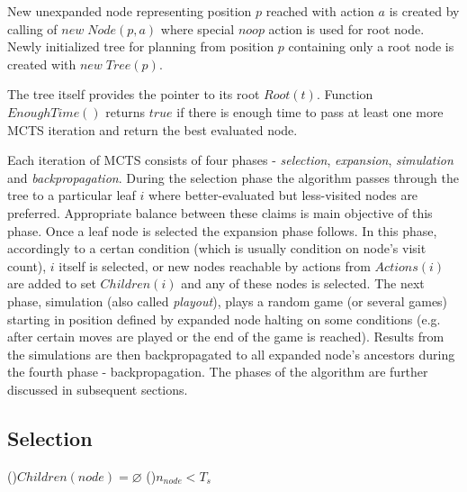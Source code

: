 New unexpanded node representing position $p$ reached with action $a$ is created by calling of
$new\;Node(p,a)$ where special $noop$ action is used for root node. Newly initialized tree for
planning from position $p$
containing only a root node is created with $new\;Tree(p)$.

The
tree itself provides the pointer to its root $Root(t)$. Function $EnoughTime()$ returns $true$ if
there is enough time to pass at least one more MCTS iteration and return the best evaluated node.

Each iteration of MCTS consists of four
phases - \emph{selection}, \emph{expansion}, \emph{simulation} and \emph{backpropagation}. During
the selection phase the 
algorithm passes through the tree to a particular leaf $i$ where better-evaluated but less-visited nodes
are preferred. Appropriate balance between these claims is main objective of this
phase. Once a leaf node is selected the expansion phase follows. In this phase, accordingly to a
certan condition (which is usually condition on node's visit count), $i$ itself is selected, or
new nodes reachable by actions from $Actions(i)$ are added to set $Children(i)$ and any of these
nodes is selected.
The next phase, simulation (also called \emph{playout}), plays a random game (or several games) 
starting
in position defined by expanded node halting on some conditions (e.g. after certain moves are
played or the end of the game is reached). Results from the simulations are then backpropagated to all
expanded node's ancestors during the fourth phase - backpropagation. The phases of the algorithm are
further discussed in subsequent sections.



\subsection{Selection}

\begin{algorithm}
\DontPrintSemicolon
\caption{$SelectionStep(node)$\label{alg_selection_step}}
\If(){$Children(node)=\varnothing$}{
}
\If(){$n_{node} < T_s$}{
     
}
 
\end{algorithm}

